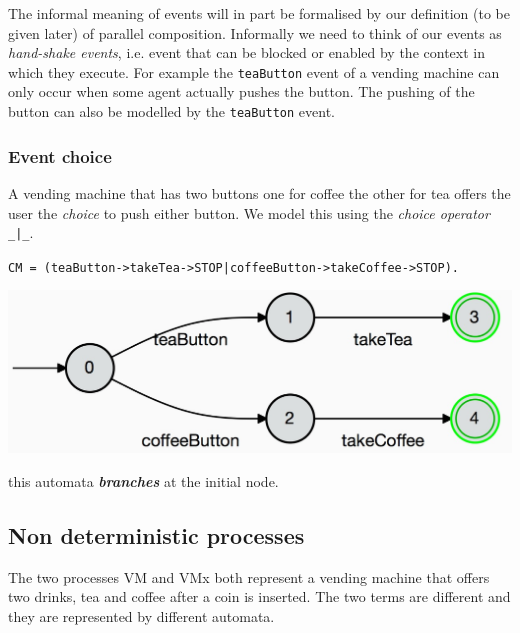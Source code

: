 \documentclass[]{article}
\begin{document}
 The informal meaning of events  will  in part be formalised  by our  definition (to be given later) of  parallel composition. Informally we need to think of our events as \emph{hand-shake events}, i.e. event that can be blocked or enabled by the context in which they execute. For example the \verb$teaButton$ event of a vending machine can only occur when some agent actually pushes the button.  The pushing of the button  can also be modelled  by the \verb$teaButton$ event.




\subsubsection{Event choice}
A vending machine that has two buttons one for coffee the other for tea offers the user the \emph{choice} to push either button. We model this using the \emph{choice operator} \verb$_|_$.



\noindent\begin{center}  \verb$CM = (teaButton->takeTea->STOP|coffeeButton->takeCoffee->STOP).$

\includegraphics[scale=0.15]{CM.jpg}\end{center}

\noindent this automata {\bf \it branches} at the  initial node.

\subsection{Non deterministic processes} \label{sec:ndfa}
The two processes {\sf VM}  and {\sf VMx} both represent a vending machine that offers two drinks, {\sf tea} and {\sf coffee} after a coin is inserted. The two  terms are different and they are represented by  different automata.
\end{document}
